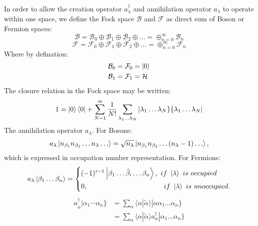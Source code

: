 \documentclass[12pt]{article}
\begin{document}
In order to allow the creation operator $a^\dagger_\lambda$ and annihilation operator 
$a_\lambda$ to operate within one space, we define the Fock space 
$\mathcal{B}$ and $\mathcal{F}$ as direct sum of Boson or Fermion spaces:
\begin{equation*}
    \mathcal{B}=\mathcal{B}_0\oplus\mathcal{B}_1\oplus\mathcal{B}_2\oplus\dots
    =\oplus_{n=0}^{\infty}\mathcal{B}_n
\end{equation*}
\begin{equation*}
    \mathcal{F}=\mathcal{F}_0\oplus\mathcal{F}_1\oplus\mathcal{F}_2\oplus\dots
    =\oplus_{n=0}^{\infty}\mathcal{F}_n
\end{equation*}
Where by defination:
\begin{equation*}
    \begin{split}
        &\mathcal{B}_0=\mathcal{F}_0=\ket{0}\\
        &\mathcal{B}_1=\mathcal{F}_1=\mathcal{H}
    \end{split}
\end{equation*} 
The closure relation in the Fock space may be written:
\begin{equation*}
    1=\ket{0}\bra{0}+\sum_{N=1}^\infty\frac{1}{N!}\sum_{\lambda_1\dots\lambda_N}
    |\lambda_1\dots\lambda_N\}\{\lambda_1\dots\lambda_N|
\end{equation*}
The annihilation operator $a_\lambda$. For Bosons:
\begin{equation*}
    a_\lambda\ket{n_{\beta_1}n_{\beta_2}\dots n_{\lambda}\dots}
    =\sqrt{n_\lambda}\ket{n_{\beta_1}n_{\beta_2}\dots (n_{\lambda}-1)\dots},
\end{equation*}
which is expressed in occupation number representation.
For Fermions:
\begin{equation*}
    a_\lambda\ket{\beta_1\dots\beta_n}=\left\{
        \begin{split}
            &(-1)^{i-1}\ket{\beta_1\dots\hat{\beta}_i\dots\beta_n},\ 
            if\ \ket{\lambda}\ is\ occupied\\
            &0,\qquad\qquad\qquad\qquad\qquad\quad if\ \ket{\lambda}\ is\ unoccupied.
        \end{split}   
    \right.
\end{equation*}
\begin{equation*}
    \begin{split}
        a^{\dagger}_{\tilde{\alpha}}|\alpha_1\cdots\alpha_n\}&=\sum_{\alpha}
        \langle\alpha|\tilde{\alpha}\rangle|\alpha\alpha_1\dots\alpha_n\}\\
        &=\sum_\alpha\langle\alpha|\tilde{\alpha}\rangle a_\alpha^\dagger
        |\alpha_1\dots\alpha_n\}
    \end{split}
\end{equation*}
\end{document}
